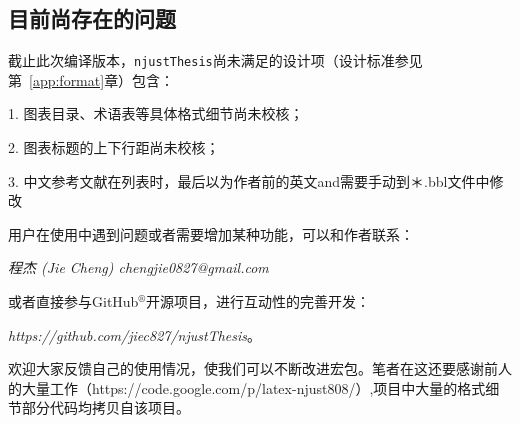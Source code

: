 \subsection{目前尚存在的问题}
\label{sec:remainingProblem}
截止此次编译版本，\texttt{njustThesis}尚未满足的设计项（设计标准参见第~\ref{app:format}章）包含：

1. 图表目录、术语表等具体格式细节尚未校核；

2. 图表标题的上下行距尚未校核；

3. 中文参考文献在列表时，最后以为作者前的英文and需要手动到＊.bbl文件中修改


用户在使用中遇到问题或者需要增加某种功能，可以和作者联系：

{\it{程杰 (Jie Cheng) \quad chengjie0827@gmail.com}}

或者直接参与GitHub$^{\circledR}$开源项目，进行互动性的完善开发：

{\it{https://github.com/jiec827/njustThesis}}。

欢迎大家反馈自己的使用情况，使我们可以不断改进宏包。笔者在这还要感谢前人的大量工作（https://code.google.com/p/latex-njust808/）,项目中大量的格式细节部分代码均拷贝自该项目。
